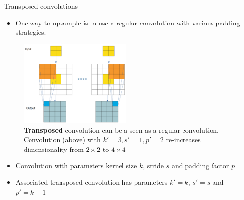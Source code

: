 \begin{vbframe}{Transposed convolutions}
\framebreak

\begin{itemize}
\item One way to upsample is to use a regular convolution with various padding strategies.
\end{itemize}
\begin{figure}
\centering
\includegraphics[width=5.5cm]{figure/transposedconv-2.png}
\caption{\textbf{Transposed} convolution can be a seen as a regular convolution. Convolution (above) with $k' = 3, s' = 1, p' = 2$ re-increases dimensionality from $2\times 2$ to $4\times 4$}
\end{figure}
    
\framebreak

\begin{itemize}
\item Convolution with parameters kernel size $k$, stride $s$ and padding factor $p$
\item Associated transposed convolution has parameters $k' = k$, $s' = s$ and $p' = k-1$
\end{itemize}


\end{vbframe}
